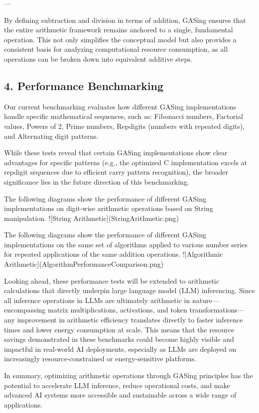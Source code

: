 ---

By defining subtraction and division in terms of addition, GASing ensures that the entire arithmetic framework remains anchored to a single, fundamental operation. This not only simplifies the conceptual model but also provides a consistent basis for analyzing computational resource consumption, as all operations can be broken down into equivalent additive steps.

\subsection{4. Performance Benchmarking}
Our current benchmarking evaluates how different GASing implementations handle specific mathematical sequences, such as: Fibonacci numbers, Factorial values, Powers of 2, Prime numbers, Repdigits (numbers with repeated digits), and Alternating digit patterns.

While these tests reveal that certain GASing implementations show clear advantages for specific patterns (e.g., the optimized C implementation excels at repdigit sequences due to efficient carry pattern recognition), the broader significance lies in the future direction of this benchmarking.

The following diagrams show the performance of different GASing implementations on digit-wise arithmetic operations based on String manipulation.
![String Arithmetic](StringArithmetic.png)


The following diagrams show the performance of different GASing implementations on the same set of algorithms applied to various number series for repeated applications of the same addition operations.
![Algorithmic Arithmetic](AlgorithmPerformanceComparison.png)


Looking ahead, these performance tests will be extended to arithmetic calculations that directly underpin large language model (LLM) inferencing. Since all inference operations in LLMs are ultimately arithmetic in nature—encompassing matrix multiplications, activations, and token transformations—any improvement in arithmetic efficiency translates directly to faster inference times and lower energy consumption at scale. This means that the resource savings demonstrated in these benchmarks could become highly visible and impactful in real-world AI deployments, especially as LLMs are deployed on increasingly resource-constrained or energy-sensitive platforms.

In summary, optimizing arithmetic operations through GASing principles has the potential to accelerate LLM inference, reduce operational costs, and make advanced AI systems more accessible and sustainable across a wide range of applications.

